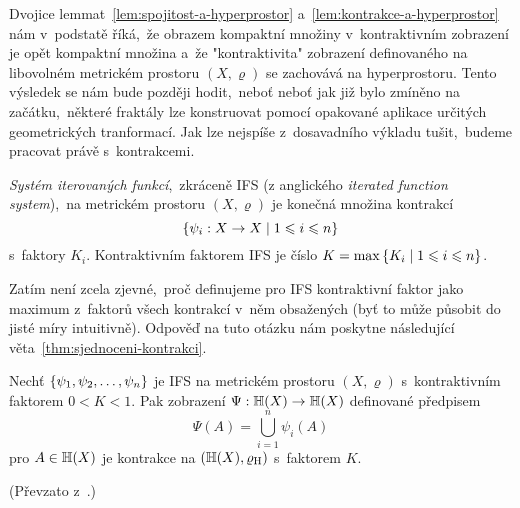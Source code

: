 Dvojice lemmat~\ref{lem:spojitost-a-hyperprostor} a~\ref{lem:kontrakce-a-hyperprostor} nám v~podstatě říká,~že obrazem kompaktní množiny v~kontraktivním zobrazení je opět kompaktní množina a~že "kontraktivita" zobrazení definovaného na libovolném metrickém prostoru $(X,\varrho)$ se zachovává na hyperprostoru. Tento výsledek se nám bude později hodit,~neboť neboť jak již bylo zmíněno na začátku,~některé fraktály lze konstruovat pomocí opakované aplikace určitých geometrických tranformací. Jak lze nejspíše z~dosavadního výkladu tušit,~budeme pracovat právě s~kontrakcemi.
\begin{definition}\label{def:system-iterovanych-funkci}
    \emph{Systém iterovaných funkcí},~zkráceně IFS (z anglického \emph{iterated function system}),~na metrickém prostoru $(X,\varrho)$ je konečná množina kontrakcí
    \[\left\{\psi_i:X \rightarrow X\mid 1\leqslant i\leqslant n\right\}\]
    s~faktory $K_i$. Kontraktivním faktorem IFS je číslo $K=\max\left\{K_i\mid 1\leqslant i\leqslant n\right\}$.
\end{definition}
Zatím není zcela zjevné,~proč definujeme pro IFS kontraktivní faktor jako maximum z~faktorů všech kontrakcí v~něm obsažených (byť to může působit do jisté míry intuitivně). Odpověď na tuto otázku nám poskytne následující věta~\ref{thm:sjednoceni-kontrakci}.
\begin{theorem}\label{thm:sjednoceni-kontrakci}
    Nechť $\left\{\psi_1,\psi_2,\ldots,\psi_n\right\}$ je IFS na metrickém prostoru $(X,\varrho)$ s~kontraktivním faktorem $0<K<1$. Pak zobrazení $\Psi:\mathbb{H}(X) \rightarrow \mathbb{H}(X)$ definované předpisem
    \[\Psi(A)=\bigcup_{i=1}^n\psi_i(A)\]
    pro $A\in\mathbb{H}(X)$ je kontrakce na $(\mathbb{H}(X),\varrho_\textup{H})$ s~faktorem $K$.
\end{theorem}
(Převzato z~\citep[str. 81]{Barnsley1993}.)

